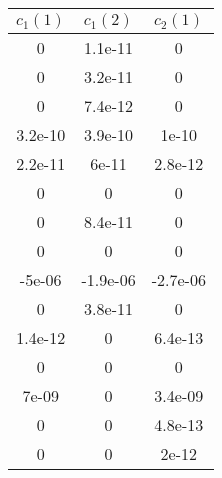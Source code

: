 \begin{tiny}\begin{tabular}{|c|c|c|}
\hline
\textbf{$c_1(1)$}&\textbf{$c_1(2)$}&\textbf{$c_2(1)$}\\\hline
0&1.1e-11&0\\\hline
0&3.2e-11&0\\\hline
0&7.4e-12&0\\\hline
3.2e-10&3.9e-10&1e-10\\\hline
2.2e-11&6e-11&2.8e-12\\\hline
0&0&0\\\hline
0&8.4e-11&0\\\hline
0&0&0\\\hline
-5e-06&-1.9e-06&-2.7e-06\\\hline
0&3.8e-11&0\\\hline
1.4e-12&0&6.4e-13\\\hline
0&0&0\\\hline
7e-09&0&3.4e-09\\\hline
0&0&4.8e-13\\\hline
0&0&2e-12\\\hline
\end{tabular}
\end{tiny}